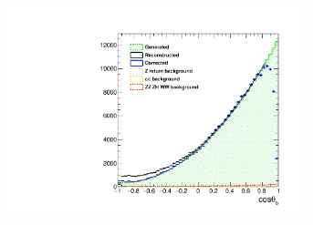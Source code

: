 
\begin{figure}
	\centering
	\begin{subfigure}{0.5\textwidth}
		\includegraphics[width=0.95\textwidth]{ILD/plots/basymmetry-final-left.pdf}
		\caption{\label{fig:BAsymmetryFinal_a_3F} }
	\end{subfigure}%
	\begin{subfigure}{0.5\textwidth}

\end{subfigure}
\end{figure}
